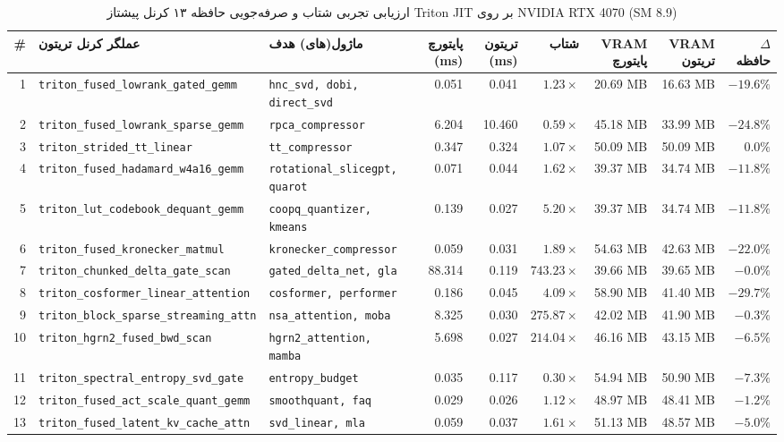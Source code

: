 \begin{table}[H]
\centering
\caption{ارزیابی تجربی شتاب و صرفه‌جویی حافظه ۱۳ کرنل پیشتاز Triton JIT بر روی NVIDIA RTX 4070 (SM 8.9)}
\label{tab:app_flagship_triton_kernels}
\scriptsize
\setlength{\tabcolsep}{3.5pt}
\begin{tabular}{rllrrrrrr}
\toprule
\textbf{\#} & \textbf{عملگر کرنل تریتون} & \textbf{ماژول(های) هدف} & \textbf{پایتورچ (ms)} & \textbf{تریتون (ms)} & \textbf{شتاب} & \textbf{VRAM پایتورچ} & \textbf{VRAM تریتون} & \textbf{$\Delta$حافظه} \\
\midrule
1 & \texttt{triton\_fused\_lowrank\_gated\_gemm} & \texttt{hnc\_svd, dobi, direct\_svd} & 0.051 & 0.041 & $\mathbf{1.23\times}$ & 20.69 MB & 16.63 MB & $\mathbf{-19.6\%}$ \\
2 & \texttt{triton\_fused\_lowrank\_sparse\_gemm} & \texttt{rpca\_compressor} & 6.204 & 10.460 & $0.59\times$ & 45.18 MB & 33.99 MB & $\mathbf{-24.8\%}$ \\
3 & \texttt{triton\_strided\_tt\_linear} & \texttt{tt\_compressor} & 0.347 & 0.324 & $\mathbf{1.07\times}$ & 50.09 MB & 50.09 MB & $0.0\%$ \\
4 & \texttt{triton\_fused\_hadamard\_w4a16\_gemm} & \texttt{rotational\_slicegpt, quarot} & 0.071 & 0.044 & $\mathbf{1.62\times}$ & 39.37 MB & 34.74 MB & $\mathbf{-11.8\%}$ \\
5 & \texttt{triton\_lut\_codebook\_dequant\_gemm} & \texttt{coopq\_quantizer, kmeans} & 0.139 & 0.027 & $\mathbf{5.20\times}$ & 39.37 MB & 34.74 MB & $\mathbf{-11.8\%}$ \\
6 & \texttt{triton\_fused\_kronecker\_matmul} & \texttt{kronecker\_compressor} & 0.059 & 0.031 & $\mathbf{1.89\times}$ & 54.63 MB & 42.63 MB & $\mathbf{-22.0\%}$ \\
7 & \texttt{triton\_chunked\_delta\_gate\_scan} & \texttt{gated\_delta\_net, gla} & 88.314 & 0.119 & $\mathbf{743.23\times}$ & 39.66 MB & 39.65 MB & $-0.0\%$ \\
8 & \texttt{triton\_cosformer\_linear\_attention} & \texttt{cosformer, performer} & 0.186 & 0.045 & $\mathbf{4.09\times}$ & 58.90 MB & 41.40 MB & $\mathbf{-29.7\%}$ \\
9 & \texttt{triton\_block\_sparse\_streaming\_attn} & \texttt{nsa\_attention, moba} & 8.325 & 0.030 & $\mathbf{275.87\times}$ & 42.02 MB & 41.90 MB & $-0.3\%$ \\
10 & \texttt{triton\_hgrn2\_fused\_bwd\_scan} & \texttt{hgrn2\_attention, mamba} & 5.698 & 0.027 & $\mathbf{214.04\times}$ & 46.16 MB & 43.15 MB & $\mathbf{-6.5\%}$ \\
11 & \texttt{triton\_spectral\_entropy\_svd\_gate} & \texttt{entropy\_budget} & 0.035 & 0.117 & $0.30\times$ & 54.94 MB & 50.90 MB & $\mathbf{-7.3\%}$ \\
12 & \texttt{triton\_fused\_act\_scale\_quant\_gemm} & \texttt{smoothquant, faq} & 0.029 & 0.026 & $\mathbf{1.12\times}$ & 48.97 MB & 48.41 MB & $-1.2\%$ \\
13 & \texttt{triton\_fused\_latent\_kv\_cache\_attn} & \texttt{svd\_linear, mla} & 0.059 & 0.037 & $\mathbf{1.61\times}$ & 51.13 MB & 48.57 MB & $\mathbf{-5.0\%}$ \\
\bottomrule
\end{tabular}
\end{table}

